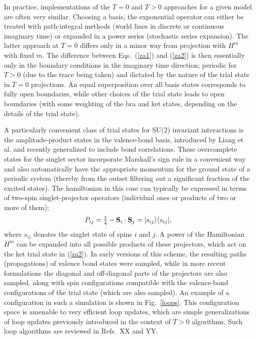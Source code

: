 \documentclass[range]{ar2e}
\begin{document}
In practice, implementations of the $T=0$ and $T>0$ approaches for a given model are often very similar. Choosing a basis, the exponential
operator can either be treated with path-integral methods (world lines in discrete or continuous imaginary time) or expanded in a power series 
(stochastic series expansion). The latter approach at $T=0$ differs only in a minor way from projection with $H^m$ with fixed $m$. The difference 
between Eqs.~(\ref{za1}) and (\ref{za2}) is then essentially only in the boundary conditions in the imaginary time direction; periodic for $T>0$ 
(due to the trace being taken) and dictated by the nature of the trial state in $T=0$ projections. An equal superposition over all basis states 
corresponds to fully open boundaries, while other choices of the trial state leads to open boundaries (with some weighting of the bra and ket 
states, depending on the details of the trial state). 

A particularly convenient class of trial states for SU($2$) invariant interactions is the amplitude-product states in the valence-bond basis, 
introduced by Liang et al. and recently generalized to include bond correlations. These overcomplete states for the singlet sector incorporate
Marshall's sign rule in a convenient way and also automatically have the appropriate momentum for the ground state of a periodic system (thereby
from the outset filtering out a significant fraction of the excited states). The hamiltonian in this case can typically be expressed in terms of 
two-spin singlet-projector operators  (individual ones or products of two or more of them);
\begin{equation}
P_{ij}=\hbox{$\frac{1}{4}$}-{\bf S}_i\cdot {\bf S}_j = |s_{ij}\rangle\langle s_{ij}|,
\label{psinglet}
\end{equation}
where $s_{ij}$ denotes the singlet state of spins $i$ and $j$.
A power of the Hamiltonian $H^m$ can be expanded into all possible products of these projectors, which act on the ket trial state in 
(\ref{za2}). In early versions of this scheme, the resulting paths (propagations) of valence bond states were sampled, while in more 
recent formulations the diagonal and off-diagonal parts of the projectors are also sampled, along with spin configurations compatible with 
the valence-bond configurations of the trial state (which are also sampled).\cite{Sandvik10a} An example of a configuration in such a simulation is shown 
in Fig.~\ref{loops}. This configuration space is amenable to very efficient loop updates, which are simple generalizations of loop updates 
previously introduced in the context of $T>0$ algorithms. Such loop algorithms are reviewed in Refs.~XX and YY.
\end{document}
